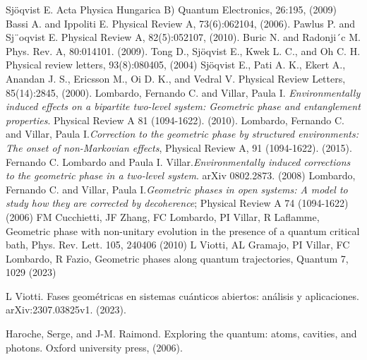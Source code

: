 \begin{thebibliography}{9}
Sj\"oqvist E. Acta Physica Hungarica B) Quantum Electronics, 26:195, (2009)
Bassi A. and Ippoliti E. Physical Review A, 73(6):062104, (2006).
Pawlus P. and Sj¨oqvist E. Physical Review A, 82(5):052107, (2010).
Buric N. and Radonji´c M. Phys. Rev. A, 80:014101. (2009).
Tong D., Sj\"oqvist E., Kwek L. C., and Oh C. H. Physical review letters, 93(8):080405, (2004)
Sj\"oqvist E., Pati A. K., Ekert A., Anandan J. S., Ericsson M., Oi D. K., and Vedral V. Physical Review Letters, 85(14):2845, (2000).
Lombardo, Fernando C. and Villar, Paula I. \textit{Environmentally induced effects on a bipartite two-level system: Geometric phase and entanglement properties}. Physical Review A 81 (1094-1622). (2010).
Lombardo, Fernando C. and Villar, Paula I.\textit{Correction to the geometric phase by structured environments: The onset of non-Markovian effects}, Physical Review A, 91 (1094-1622). (2015).
Fernando C. Lombardo and Paula I. Villar.\textit{Environmentally induced corrections to the geometric phase in a two-level system}. arXiv 0802.2873. (2008)
Lombardo, Fernando C. and Villar, Paula I.\textit{Geometric phases in open systems: A model to study how they are corrected by decoherence}; Physical Review A 74 (1094-1622) (2006)
 FM Cucchietti, JF Zhang, FC Lombardo, PI Villar, R Laflamme, Geometric phase with non-unitary evolution in the presence of a quantum critical bath, Phys. Rev. Lett. 105, 240406 (2010)
L Viotti, AL Gramajo, PI Villar, FC Lombardo, R Fazio, Geometric phases along quantum trajectories, Quantum 7, 1029 (2023)

L Viotti. Fases geométricas en sistemas cuánticos abiertos: análisis y aplicaciones. arXiv:2307.03825v1. (2023).

Haroche, Serge, and J-M. Raimond. 
Exploring the quantum: atoms, cavities, and photons.
Oxford university press, (2006).


\end{thebibliography}
